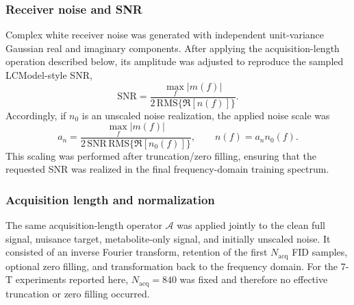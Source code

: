 \subsubsection{Receiver noise and SNR}

Complex white receiver noise was generated with independent unit-variance
Gaussian real and imaginary components.  After applying the acquisition-length
operation described below, its amplitude was adjusted to reproduce the sampled
LCModel-style SNR,
\begin{equation}
    \mathrm{SNR}
    =\frac{\max_f|m(f)|}
    {2\,\mathrm{RMS}\{\Re[n(f)]\}}.
    \label{eq:snr_definition}
\end{equation}
Accordingly, if $n_0$ is an unscaled noise realization, the applied noise scale
was
\begin{equation}
    a_n=\frac{\max_f|m(f)|}
    {2\,\mathrm{SNR}\,\mathrm{RMS}\{\Re[n_0(f)]\}},
    \qquad n(f)=a_n n_0(f).
\end{equation}
This scaling was performed after truncation/zero filling, ensuring that the
requested SNR was realized in the final frequency-domain training spectrum.

\subsubsection{Acquisition length and normalization}

The same acquisition-length operator $\mathcal{A}$ was applied jointly to the
clean full signal, nuisance target, metabolite-only signal, and initially
unscaled noise.  It consisted of an inverse Fourier transform, retention of the
first $N_{\mathrm{acq}}$ FID samples, optional zero filling, and transformation
back to the frequency domain.  For the 7-T experiments reported here,
$N_{\mathrm{acq}}=840$ was fixed and therefore no effective truncation or zero
filling occurred.

